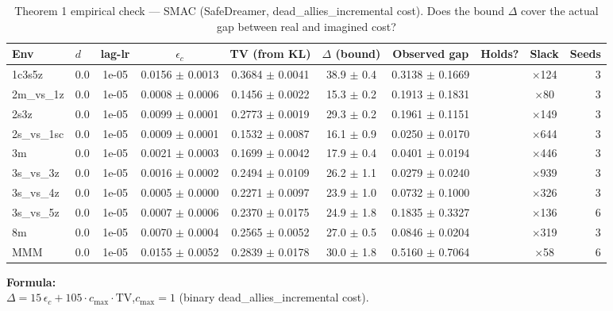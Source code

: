 \documentclass[10pt]{article}
\newcommand{\cmark}{\checkmark}
\begin{document}
\begin{table}[h]
\centering
\caption{Theorem 1 empirical check --- SMAC (SafeDreamer, dead\_allies\_incremental cost).
    Does the bound $\Delta$ cover the actual gap between real and imagined cost?}
\small
\begin{tabular}{llcccccccr}
\toprule
Env & $d$ & lag-lr & $\epsilon_c$ & TV (from KL) & $\Delta$ (bound) & Observed gap & Holds? & Slack & Seeds \\
\midrule
        1c3s5z & 0.0 & 1e-05 & 0.0156 $\pm$ 0.0013 & 0.3684 $\pm$ 0.0041 & 38.9 $\pm$ 0.4 & 0.3138 $\pm$ 0.1669 & \cmark & $\times$124 & 3 \\
        2m_vs_1z & 0.0 & 1e-05 & 0.0008 $\pm$ 0.0006 & 0.1456 $\pm$ 0.0022 & 15.3 $\pm$ 0.2 & 0.1913 $\pm$ 0.1831 & \cmark & $\times$80 & 3 \\
        2s3z & 0.0 & 1e-05 & 0.0099 $\pm$ 0.0001 & 0.2773 $\pm$ 0.0019 & 29.3 $\pm$ 0.2 & 0.1961 $\pm$ 0.1151 & \cmark & $\times$149 & 3 \\
        2s_vs_1sc & 0.0 & 1e-05 & 0.0009 $\pm$ 0.0001 & 0.1532 $\pm$ 0.0087 & 16.1 $\pm$ 0.9 & 0.0250 $\pm$ 0.0170 & \cmark & $\times$644 & 3 \\
        3m & 0.0 & 1e-05 & 0.0021 $\pm$ 0.0003 & 0.1699 $\pm$ 0.0042 & 17.9 $\pm$ 0.4 & 0.0401 $\pm$ 0.0194 & \cmark & $\times$446 & 3 \\
        3s_vs_3z & 0.0 & 1e-05 & 0.0016 $\pm$ 0.0002 & 0.2494 $\pm$ 0.0109 & 26.2 $\pm$ 1.1 & 0.0279 $\pm$ 0.0240 & \cmark & $\times$939 & 3 \\
        3s_vs_4z & 0.0 & 1e-05 & 0.0005 $\pm$ 0.0000 & 0.2271 $\pm$ 0.0097 & 23.9 $\pm$ 1.0 & 0.0732 $\pm$ 0.1000 & \cmark & $\times$326 & 3 \\
        3s_vs_5z & 0.0 & 1e-05 & 0.0007 $\pm$ 0.0006 & 0.2370 $\pm$ 0.0175 & 24.9 $\pm$ 1.8 & 0.1835 $\pm$ 0.3327 & \cmark & $\times$136 & 6 \\
        8m & 0.0 & 1e-05 & 0.0070 $\pm$ 0.0004 & 0.2565 $\pm$ 0.0052 & 27.0 $\pm$ 0.5 & 0.0846 $\pm$ 0.0204 & \cmark & $\times$319 & 3 \\
        MMM & 0.0 & 1e-05 & 0.0155 $\pm$ 0.0052 & 0.2839 $\pm$ 0.0178 & 30.0 $\pm$ 1.8 & 0.5160 $\pm$ 0.7064 & \cmark & $\times$58 & 6 \\
\bottomrule
\end{tabular}
\end{table}

\vspace{1em}
\noindent\textbf{Formula:}\\
$\Delta = 15\,\epsilon_c + 105 \cdot c_{\max} \cdot \text{TV}$,\quad $c_{\max}=1$ (binary dead\_allies\_incremental cost).
\end{document}
